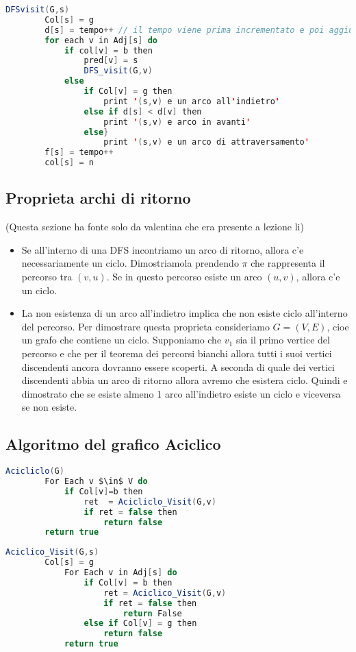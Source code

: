 \begin{lstlisting}[language=Java]
	DFSvisit(G,s)
		Col[s] = g
		d[s] = tempo++ // il tempo viene prima incrementato e poi aggiunto a d[s]
		for each v in Adj[s] do 
			if col[v] = b then
				pred[v] = s
				DFS_visit(G,v)
			else
				if Col[v] = g then
					print '(s,v) e un arco all'indietro'
				else if d[s] < d[v] then
					print '(s,v) e arco in avanti'
				else}
					print '(s,v) e un arco di attraversamento'
		f[s] = tempo++
		col[s] = n
\end{lstlisting}

\subsection{Proprieta archi di ritorno}
(Questa sezione ha fonte solo da valentina che era presente a lezione li)

\begin{itemize}
	\item Se all'interno di una DFS incontriamo un arco di ritorno, allora c'e necessariamente un ciclo.
		Dimostriamola prendendo $\pi$ che rappresenta il percorso tra $(v,u)$. Se in questo percorso esiste un arco $(u,v)$, allora c'e un ciclo.
	\item La non esistenza di un arco all'indietro implica che non esiste ciclo all'interno del percorso.
		Per dimostrare questa proprieta consideriamo $G = (V,E)$, cioe un grafo che contiene un ciclo. Supponiamo che $v_1$ sia il primo vertice del percorso e che per il teorema dei percorsi bianchi allora tutti i suoi vertici discendenti ancora dovranno essere scoperti. A seconda di quale dei vertici discendenti abbia un arco di ritorno allora avremo che esistera ciclo. Quindi e dimostrato che se esiste almeno 1 arco all'indietro esiste un ciclo e viceversa se non esiste.
\end{itemize}

\subsection{Algoritmo del grafico Aciclico}


\begin{lstlisting}[language=Java]
	Acicliclo(G)
		For Each v $\in$ V do
			if Col[v]=b then
				ret  = Acicliclo_Visit(G,v)
				if ret = false then
					return false
		return true
\end{lstlisting}


\begin{lstlisting}[language=Java]
	Aciclico_Visit(G,s)
		Col[s] = g
			For Each v in Adj[s] do 
				if Col[v] = b then
					ret = Aciclico_Visit(G,v)
					if ret = false then
						return False
				else if Col[v] = g then
					return false
			return true
\end{lstlisting}

